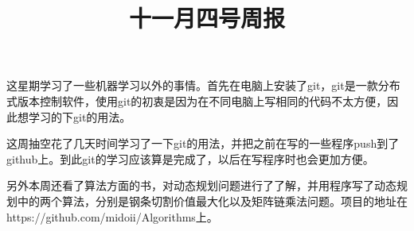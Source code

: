 \documentclass[UTF8]{ctexart}
\title{十一月四号周报}
\date{}
\begin{document}
	\maketitle
	这星期学习了一些机器学习以外的事情。首先在电脑上安装了git，git是一款分布式版本控制软件，使用git的初衷是因为在不同电脑上写相同的代码不太方便，因此想学习的下git的用法。
	\par
	这周抽空花了几天时间学习了一下git的用法，并把之前在写的一些程序push到了github上。到此git的学习应该算是完成了，以后在写程序时也会更加方便。
	\par
	另外本周还看了算法方面的书，对动态规划问题进行了了解，并用程序写了动态规划中的两个算法，分别是钢条切割价值最大化以及矩阵链乘法问题。项目的地址在https://github.com/midoii/Algorithms上。
	
\end{document}
